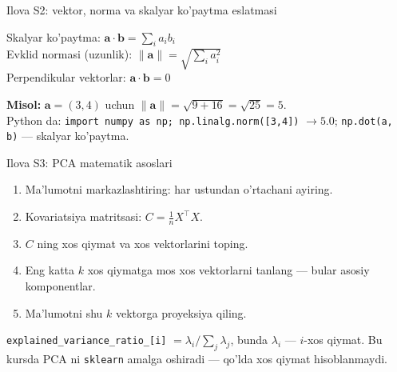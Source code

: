 \documentclass[aspectratio=169,11pt]{beamer}
\begin{document}
\begin{frame}{Ilova S2: vektor, norma va skalyar ko'paytma eslatmasi}
  \begin{tcolorbox}[defbox,title=Kerakli tushunchalar]
    \small
    Skalyar ko'paytma: $\mathbf{a}\cdot\mathbf{b}=\sum_i a_i b_i$\\[3pt]
    Evklid normasi (uzunlik): $\lVert\mathbf{a}\rVert=\sqrt{\sum_i a_i^2}$\\[3pt]
    Perpendikular vektorlar: $\mathbf{a}\cdot\mathbf{b}=0$
  \end{tcolorbox}
  \vspace{4pt}
  \small\textbf{Misol:} $\mathbf{a}=(3,4)$ uchun
  $\lVert\mathbf{a}\rVert=\sqrt{9+16}=\sqrt{25}=5$.\\[3pt]
  Python da: \texttt{import numpy as np; np.linalg.norm([3,4])} $\to 5.0$;\quad
  \texttt{np.dot(a, b)} --- skalyar ko'paytma.
\end{frame}

\begin{frame}{Ilova S3: PCA matematik asoslari}
  \begin{enumerate}\small\setlength\itemsep{5pt}
    \item Ma'lumotni markazlashtiring: har ustundan o'rtachani ayiring.
    \item Kovariatsiya matritsasi: $C=\frac{1}{n}X^\top X$.
    \item $C$ ning xos qiymat va xos vektorlarini toping.
    \item Eng katta $k$ xos qiymatga mos xos vektorlarni tanlang ---
          bular asosiy komponentlar.
    \item Ma'lumotni shu $k$ vektorga proyeksiya qiling.
  \end{enumerate}
  \vspace{4pt}
  \footnotesize\color{halfgray}
  \texttt{explained\_variance\_ratio\_[i]} $=\lambda_i / \sum_j \lambda_j$,
  bunda $\lambda_i$ --- $i$-xos qiymat. Bu kursda PCA ni \texttt{sklearn}
  amalga oshiradi --- qo'lda xos qiymat hisoblanmaydi.
\end{frame}
\end{document}
